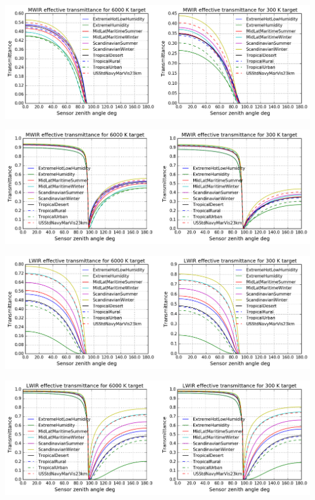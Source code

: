 \documentclass{workpackage}
\begin{document}
\begin{center}
\includegraphics{./pic/Analyse-Standard-Atmospheres_44_6.png}
\end{center}

\begin{center}
\includegraphics{./pic/Analyse-Standard-Atmospheres_44_7.png}
\end{center}

\begin{center}
\includegraphics{./pic/Analyse-Standard-Atmospheres_44_8.png}
\end{center}

\begin{center}
\includegraphics{./pic/Analyse-Standard-Atmospheres_44_9.png}
\end{center}
\end{document}
